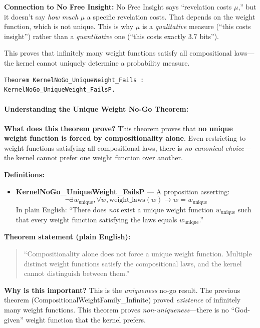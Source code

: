 \textbf{Connection to No Free Insight:} No Free Insight says ``revelation costs $\mu$,'' but it doesn't say \textit{how much} $\mu$ a specific revelation costs. That depends on the weight function, which is not unique. This is why $\mu$ is a \textit{qualitative} measure (``this costs insight'') rather than a \textit{quantitative} one (``this costs exactly 3.7 bits'').


This proves that infinitely many weight functions satisfy all compositional laws---the kernel cannot uniquely determine a probability measure.

\begin{lstlisting}
Theorem KernelNoGo_UniqueWeight_Fails : KernelNoGo_UniqueWeight_FailsP.
\end{lstlisting}

\paragraph{Understanding the Unique Weight No-Go Theorem:}

\textbf{What does this theorem prove?} This theorem proves that \textbf{no unique weight function is forced by compositionality alone}. Even restricting to weight functions satisfying all compositional laws, there is \textit{no canonical choice}---the kernel cannot prefer one weight function over another.

\textbf{Definitions:}
\begin{itemize}
    \item \textbf{KernelNoGo\_UniqueWeight\_FailsP} — A proposition asserting:
    \[
    \neg \exists w_{\text{unique}}, \forall w, \text{weight\_laws}(w) \to w = w_{\text{unique}}
    \]
    In plain English: ``There does \textit{not} exist a unique weight function $w_{\text{unique}}$ such that every weight function satisfying the laws equals $w_{\text{unique}}$.''
\end{itemize}

\textbf{Theorem statement (plain English):}
\begin{quote}
``Compositionality alone does not force a unique weight function. Multiple distinct weight functions satisfy the compositional laws, and the kernel cannot distinguish between them.''
\end{quote}

\textbf{Why is this important?} This is the \textit{uniqueness} no-go result. The previous theorem (CompositionalWeightFamily\_Infinite) proved \textit{existence} of infinitely many weight functions. This theorem proves \textit{non-uniqueness}---there is no ``God-given'' weight function that the kernel prefers.

